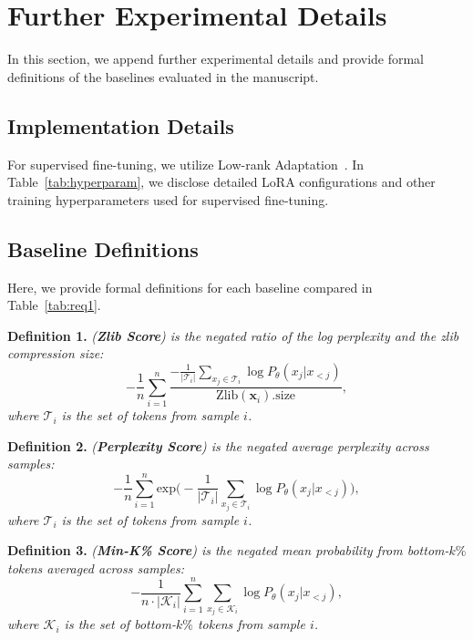 \section{Further Experimental Details}
\label{apdx:details}
In this section, we append further experimental details and provide formal definitions of the baselines evaluated in the manuscript.

\subsection{Implementation Details}
For supervised fine-tuning, we utilize Low-rank Adaptation~\cite{hulora}.
In Table~\ref{tab:hyperparam}, we disclose detailed LoRA configurations and other training hyperparameters used for supervised fine-tuning.




\subsection{Baseline Definitions}
\label{app:baseline}
Here, we provide formal definitions for each baseline compared in Table~\ref{tab:req1}.


\noindent\textbf{Definition 1.} \textit{(\textbf{Zlib Score}) is the negated ratio of the log perplexity and the zlib compression size:}
\begin{equation}
    -\frac{1}{n}\sum_{i=1}^n \frac{ -\frac{1}{|\mathcal{T}_i|}\sum_{x_j \in \mathcal{T}_i} \log P_\theta(x_j | x_{<j})}{\text{Zlib}(\mathbf{x}_i).\text{size}},
\end{equation}
\textit{where $\mathcal{T}_i$ is the set of tokens from sample $i$.}~\cite{carlini2021extracting}

\noindent\textbf{Definition 2.} \textit{(\textbf{Perplexity Score}) is the negated average perplexity across samples:}
\begin{equation}
    -\frac{1}{n}\sum_{i=1}^n \text{exp}\bigg(-\frac{1}{|\mathcal{T}_i|}\sum_{x_j \in \mathcal{T}_i} \log P_\theta(x_j | x_{<j})\bigg),
\end{equation}
\textit{where $\mathcal{T}_i$ is the set of tokens from sample $i$.}~\cite{li2023estimating}


\noindent\textbf{Definition 3.} \textit{(\textbf{Min-K\% Score}) is the negated mean probability from bottom-$k\%$ tokens averaged across samples:}
\begin{equation}
    -\frac{1}{n \cdot |\mathcal{K}_i|}\sum_{i=1}^n \sum_{x_j \in \mathcal{K}_i} \log P_\theta(x_j | x_{<j}),
\end{equation}
\textit{where $\mathcal{K}_i$ is the set of bottom-$k\%$ tokens from sample $i$.}~\cite{shidetecting}

